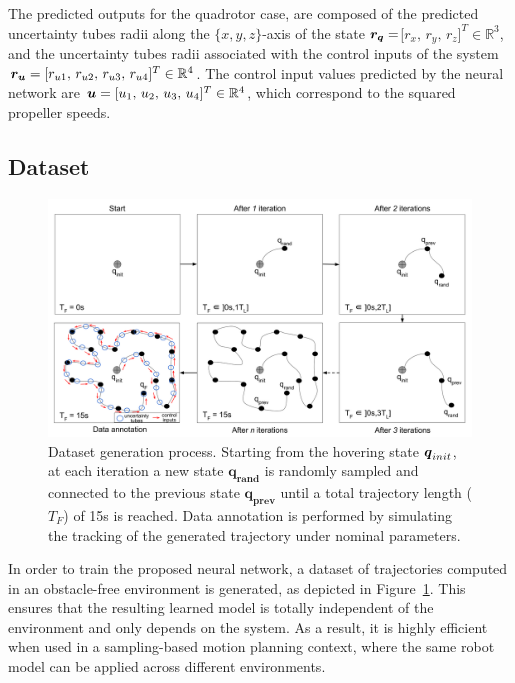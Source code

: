 The predicted outputs for the quadrotor case, are composed of the predicted uncertainty tubes radii along the $\{x,y,z\}$-axis of the state $\boldsymbol{r_q}=$[$r_{x},\,r_{y},\,r_{z}]^T \in \mathbb{R}^3$, and the uncertainty tubes radii associated with the control inputs of the system $\boldsymbol{r_u} = [r_{u1},\,r_{u2},\,r_{u3},\,r_{u4}]^T \in \mathbb{R}^4$.
The control input values predicted by the neural network are $\boldsymbol{u} = [u_1 ,\, u_2 ,\, u_3 ,\, u_4]^T \in \mathbb{R}^4$, which correspond to the squared propeller speeds.

\subsection{Dataset}\label{sec:dataset_general}

\begin{figure} [t]
    \centering
    \includegraphics[width=0.9\linewidth]{figures/learning_quadrotor/dataset_generation.png}%
    \caption{Dataset generation process. 
    Starting from the hovering state $\boldsymbol{q}_{init}$, at each iteration a new state $\boldsymbol{q_{rand}}$ is randomly sampled and connected to the previous state $\boldsymbol{q_{prev}}$ until a total trajectory length ($T_F$) of 15s is reached.
    Data annotation is performed by simulating the tracking of the generated trajectory under nominal parameters.
    }%
    \label{fig: data_generation}%
\end{figure}

In order to train the proposed neural network, a dataset of trajectories computed in an obstacle-free environment is generated, as depicted in Figure~\ref{fig: data_generation}.
This ensures that the resulting learned model is totally independent of the environment and only depends on the system.
As a result, it is highly efficient when used in a sampling-based motion planning context, where the same robot model can be applied across different environments.

